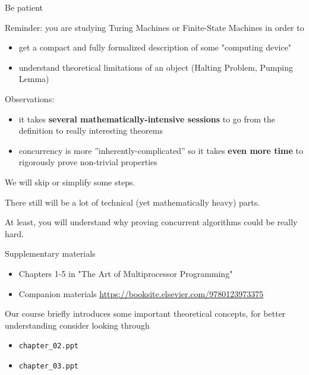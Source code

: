 \begin{frame}[t]{Be patient}

Reminder: you are studying Turing Machines or Finite-State Machines in order to
\begin{itemize}
  \item get a compact and fully formalized description of some "computing device"
  \item understand theoretical limitations of an object (Halting Problem, Pumping Lemma)
\end{itemize}

\pause

Observations:
\begin{itemize}
  \pause \item it takes \textbf{several mathematically-intensive sessions} to go from the definition to really interesting theorems
  \pause \item concurrency is more ''inherently-complicated'' so it takes \textbf{even more time} to rigorously prove non-trivial properties
\end{itemize}

\pause

We will skip or simplify some steps.

\pause
There still will be a lot of technical (yet mathematically heavy) parts. 

\pause
At least, you will understand why proving concurrent algorithms could be really hard. 

\end{frame}

\begin{frame}[t]{Supplementary materials}

\begin{itemize}
  \item Chapters 1-5 in "The Art of Multiprocessor Programming" 
  \item Companion materials \url{https://booksite.elsevier.com/9780123973375}
\end{itemize}

Our course briefly introduces some important theoretical concepts, for better understanding consider looking through
\begin{itemize}
  \item \texttt{chapter\_02.ppt}
  \item \texttt{chapter\_03.ppt}  
\end{itemize}

\end{frame}


